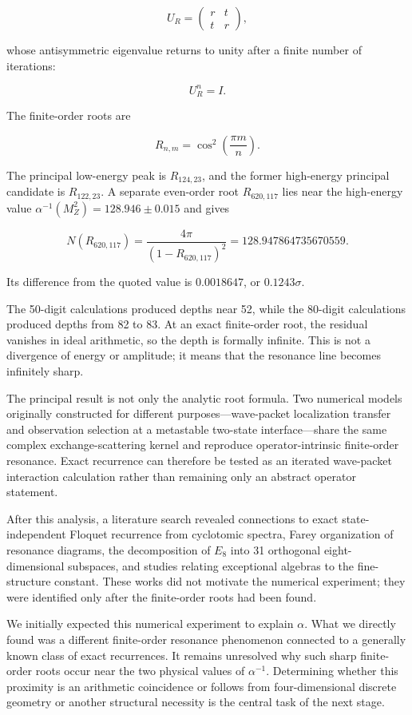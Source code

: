 \documentclass[
  10pt,
  a4paper,
]{article}
\begin{document}
\[
U_R=
\begin{pmatrix}
r&t\\
t&r
\end{pmatrix},
\]

whose antisymmetric eigenvalue returns to unity after a finite number of
iterations:

\[
U_R^n=I.
\]

The finite-order roots are

\[
\boxed{
R_{n,m}=\cos^2\left(\frac{\pi m}{n}\right)
}.
\]

The principal low-energy peak is \(R_{124,23}\), and the former
high-energy principal candidate is \(R_{122,23}\). A separate even-order
root \(R_{620,117}\) lies near the high-energy value
\(\alpha^{-1}(M_Z^2)=128.946\pm0.015\) and gives

\[
N(R_{620,117})
=\frac{4\pi}{(1-R_{620,117})^2}
=128.947864735670559.
\]

Its difference from the quoted value is \(0.0018647\), or
\(0.1243\sigma\).

The 50-digit calculations produced depths near 52, while the 80-digit
calculations produced depths from 82 to 83. At an exact finite-order
root, the residual vanishes in ideal arithmetic, so the depth is
formally infinite. This is not a divergence of energy or amplitude; it
means that the resonance line becomes infinitely sharp.

The principal result is not only the analytic root formula. Two
numerical models originally constructed for different
purposes---wave-packet localization transfer and observation selection
at a metastable two-state interface---share the same complex
exchange-scattering kernel and reproduce operator-intrinsic finite-order
resonance. Exact recurrence can therefore be tested as an iterated
wave-packet interaction calculation rather than remaining only an
abstract operator statement.

After this analysis, a literature search revealed connections to exact
state-independent Floquet recurrence from cyclotomic spectra, Farey
organization of resonance diagrams, the decomposition of \(E_8\) into 31
orthogonal eight-dimensional subspaces, and studies relating exceptional
algebras to the fine-structure constant. These works did not motivate
the numerical experiment; they were identified only after the
finite-order roots had been found.

We initially expected this numerical experiment to explain \(\alpha\).
What we directly found was a different finite-order resonance phenomenon
connected to a generally known class of exact recurrences. It remains
unresolved why such sharp finite-order roots occur near the two physical
values of \(\alpha^{-1}\). Determining whether this proximity is an
arithmetic coincidence or follows from four-dimensional discrete
geometry or another structural necessity is the central task of the next
stage.
\end{document}
